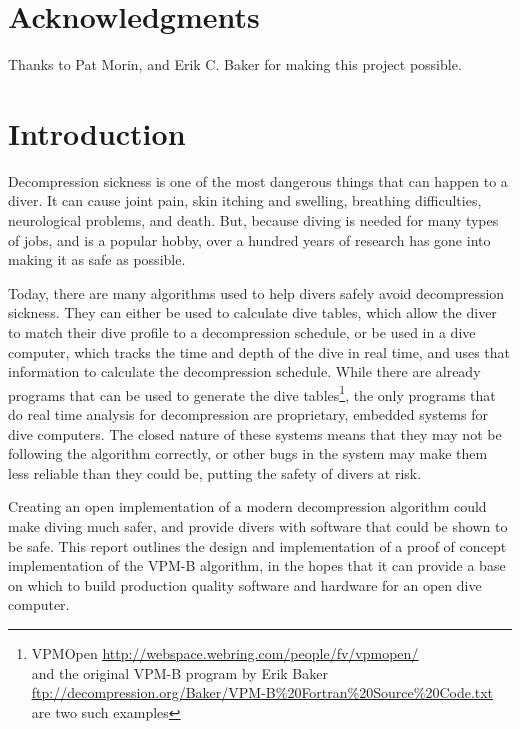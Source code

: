 \documentclass[12pt]{article}
\begin{document}
\newpage

\section*{Acknowledgments}
Thanks to Pat Morin, and Erik C. Baker for making this project possible.

\newpage

\setcounter{tocdepth}{3}
\tableofcontents
\listofalgorithms

\newpage

\section{Introduction}

 Decompression sickness is one of the most dangerous things that can happen to a diver. It can cause joint pain,
 skin itching and swelling, breathing difficulties, neurological problems, and death. But, because diving
 is needed for many types of jobs, and is a popular hobby, over a hundred years of research has gone into making
 it as safe as possible\cite{haldane07}.

 Today, there are many algorithms used to help divers safely avoid decompression sickness. They can either be
 used to calculate dive tables, which allow the diver to match their dive profile to a decompression schedule,
 or be used in a dive computer, which tracks the time and depth of the dive in real time, and uses that information
 to calculate the decompression schedule. While there are already programs that can be used to generate the
 dive tables\footnote{VPMOpen {\color{blue}\uline{\href{http://webspace.webring.com/people/fv/vpmopen/}{http://webspace.webring.com/people/fv/vpmopen/}}}\\ and the original VPM-B program by Erik Baker \\{\color{blue}\uline{\href{ftp://decompression.org/Baker/VPM-B\%20Fortran\%20Source\%20Code.txt}{ftp://decompression.org/Baker/VPM-B\%20Fortran\%20Source\%20Code.txt}}} are two such examples}, the only programs that do real time analysis for decompression are proprietary,
embedded systems for dive computers. The closed nature of these systems means that they may not be following
the algorithm correctly, or other bugs in the system may make them less reliable than they could be, putting
the safety of divers at risk.

Creating an open implementation of a modern decompression algorithm could make diving much safer, and
provide divers with software that could be shown to be safe. This report outlines the design and implementation
of a proof of concept implementation of the VPM-B algorithm, in the hopes that it can provide a base on
which to build production quality software and hardware for an open dive computer.
\end{document}
